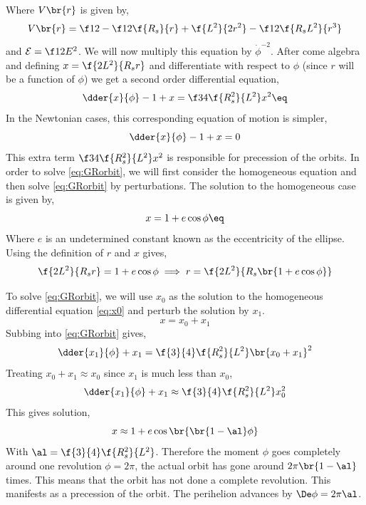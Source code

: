 \documentclass{article}
\begin{document}
Where $V\br{r}$ is given by,
\[V\br{r} = \f12 - \f12 \f{R_s}{r} + \f{L^2}{2r^2} - \f12 \f{R_sL^2}{r^3}\]
and $\mathcal{E} = \f12 E^2$. We will now multiply this equation by $\dot{\phi}^{-2}$. After come algebra and defining $x = \f{2L^2}{R_s r}$ and differentiate with respect to $\phi$ (since $r$ will be a function of $\phi$) we get a second order differential equation,
\[ \dder{x}{\phi} - 1 + x = \f34 \f{R_s^2}{L^2} x^2 \eq \label{eq:GRorbit}\]
In the Newtonian cases, this corresponding equation of motion is simpler,
\[ \dder{x}{\phi} - 1 + x = 0 \]
This extra term $\f34 \f{R_s^2}{L^2} x^2$ is responsible for precession of the orbits. In order to solve \eqref{eq:GRorbit}, we will first consider the homogeneous equation and then solve \eqref{eq:GRorbit} by perturbations. The solution to the homogeneous case is given by,
\[ x = 1 + e \cos \phi \eq \label{eq:x0}\]
Where $e$ is an undetermined constant known as the eccentricity of the ellipse. Using the definition of $r$ and $x$ gives,
\[ \f{2L^2}{R_s r} = 1 + e \cos \phi \implies r = \f{2L^2}{R_s \br{1 + e \cos \phi}}\]

\begin{center}
\end{center}

To solve \eqref{eq:GRorbit}, we will use $x_0$ as the solution to the homogeneous differential equation \eqref{eq:x0} and perturb the solution by $x_1$.
\[ x = x_0 + x_1 \]
Subbing into \eqref{eq:GRorbit} gives,
\[ \dder{x_1}{\phi} + x_1 = \f{3}{4}\f{R_s^2}{L^2} \br{x_0 + x_1}^2 \]
Treating $x_0 + x_1 \approx x_0$ since $x_1$ is much less than $x_0$,
\[ \dder{x_1}{\phi} + x_1 \approx \f{3}{4}\f{R_s^2}{L^2} x_0^2 \]
This gives solution,
\[ x \approx 1 + e \cos \br{\br{1 - \al} \phi} \]
With $\al = \f{3}{4}\f{R_s^2}{L^2}$. Therefore the moment $\phi$ goes completely around one revolution $\phi = 2 \pi$, the actual orbit has gone around $2 \pi \br{1 - \al}$ times. This means that the orbit has not done a complete revolution. This manifests as a precession of the orbit. The perihelion advances by $\De \phi = 2\pi \al$.
\end{document}
